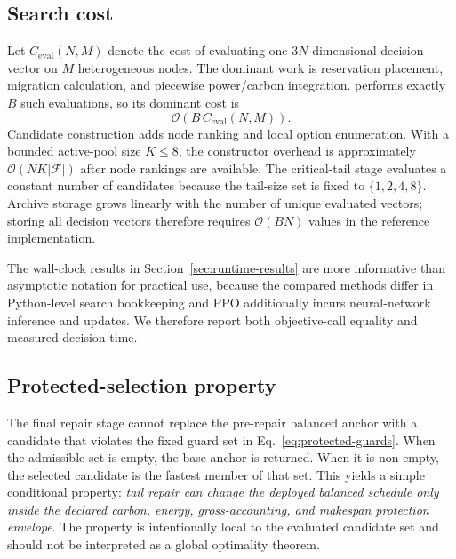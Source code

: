 \subsection{Search cost}

Let $C_{\mathrm{eval}}(N,M)$ denote the cost of evaluating one $3N$-dimensional decision vector on $M$ heterogeneous nodes. The dominant work is reservation placement, migration calculation, and piecewise power/carbon integration. \method performs exactly $B$ such evaluations, so its dominant cost is
\begin{equation}
\mathcal{O}\left(B\,C_{\mathrm{eval}}(N,M)\right).
\end{equation}
Candidate construction adds node ranking and local option enumeration. With a bounded active-pool size $K\le 8$, the constructor overhead is approximately $\mathcal{O}(NK|\mathcal{F}|)$ after node rankings are available. The critical-tail stage evaluates a constant number of candidates because the tail-size set is fixed to $\{1,2,4,8\}$. Archive storage grows linearly with the number of unique evaluated vectors; storing all decision vectors therefore requires $\mathcal{O}(BN)$ values in the reference implementation.

The wall-clock results in Section~\ref{sec:runtime-results} are more informative than asymptotic notation for practical use, because the compared methods differ in Python-level search bookkeeping and PPO additionally incurs neural-network inference and updates. We therefore report both objective-call equality and measured decision time.

\subsection{Protected-selection property}

The final repair stage cannot replace the pre-repair balanced anchor with a candidate that violates the fixed guard set in Eq.~\eqref{eq:protected-guards}. When the admissible set is empty, the base anchor is returned. When it is non-empty, the selected candidate is the fastest member of that set. This yields a simple conditional property: \emph{tail repair can change the deployed balanced schedule only inside the declared carbon, energy, gross-accounting, and makespan protection envelope}. The property is intentionally local to the evaluated candidate set and should not be interpreted as a global optimality theorem.
